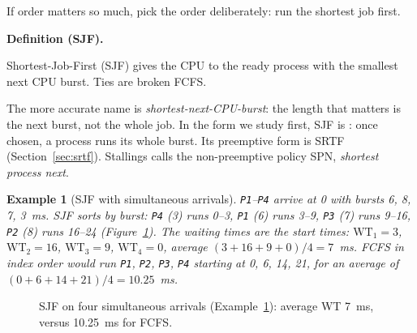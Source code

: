 \documentclass[11pt]{article}
\newtheorem{example}{Example}
\newenvironment{definitionbox}[1]{%
  \par\noindent\textbf{Definition (#1).}\ \itshape
}{\par\vspace{0.3em}}
\begin{document}
If order matters so much, pick the order deliberately: run the shortest job
first.

\begin{definitionbox}{SJF}
Shortest-Job-First (SJF) gives the CPU to the ready process with the smallest
next CPU burst. Ties are broken FCFS.
\end{definitionbox}

The more accurate name is \emph{shortest-next-CPU-burst}: the length that
matters is the next burst, not the whole job. In the form we study first, SJF is
: once chosen, a process runs its whole burst. Its
preemptive form is SRTF (Section~\ref{sec:srtf}). Stallings calls the
non-preemptive policy SPN, \emph{shortest process next}.

\begin{example}[SJF with simultaneous arrivals]
\label{ex:sjf4}
\texttt{P1}--\texttt{P4} arrive at 0 with bursts 6, 8, 7, 3~ms. SJF sorts by
burst: \texttt{P4} (3) runs 0--3, \texttt{P1} (6) runs 3--9, \texttt{P3} (7)
runs 9--16, \texttt{P2} (8) runs 16--24 (Figure~\ref{fig:s2}). The waiting
times are the start times: $\mathrm{WT}_1 = 3$, $\mathrm{WT}_2 = 16$,
$\mathrm{WT}_3 = 9$, $\mathrm{WT}_4 = 0$, average $(3+16+9+0)/4 = 7$~ms. FCFS
in index order would run \texttt{P1}, \texttt{P2}, \texttt{P3}, \texttt{P4}
starting at 0, 6, 14, 21, for an average of $(0+6+14+21)/4 = 10.25$~ms.
\end{example}

\begin{figure}[h]
\centering
{}
\caption{SJF on four simultaneous arrivals (Example~\ref{ex:sjf4}): average WT
7~ms, versus 10.25~ms for FCFS.}
\label{fig:s2}
\end{figure}
\end{document}
